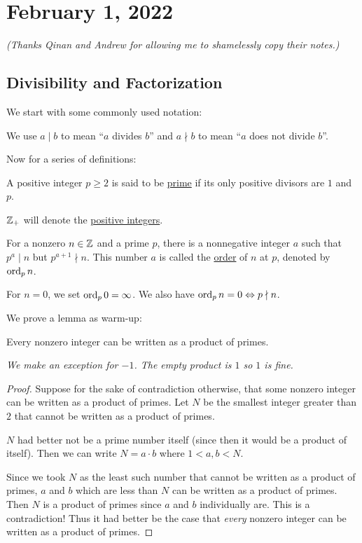 \section{February 1, 2022}

\emph{(Thanks Qinan and Andrew for allowing me to shamelessly copy their notes.)}

\subsection{Divisibility and Factorization}
We start with some commonly used notation:
\begin{definition}[Divisibility]
    We use $a\mid b$ to mean ``$a$ divides $b$'' and $a\nmid b$ to mean ``$a$ does not divide $b$''.
\end{definition}

Now for a series of definitions:

\begin{definition}[Primality]
    A positive integer $p\geq 2$ is said to be \ul{prime} if its only positive divisors are $1$ and $p$.
\end{definition}

\begin{definition}
    $\mathbb Z_+$ will denote the \ul{positive integers}.
\end{definition}

\begin{definition}[Order]
    For a nonzero $n\in \mathbb Z$ and a prime $p$, there is a nonnegative integer $a$ such that $p^a\mid n$ but $p^{a + 1}\nmid n$. This number $a$ is called the \ul{order} of $n$ at $p$, denoted by $\operatorname{ord}_p n$.

    For $n=0$, we set $\operatorname{ord}_p 0 = \infty$. We also have $\operatorname{ord}_p n = 0\Leftrightarrow p\nmid n$.
\end{definition}

We prove a lemma as warm-up:
\begin{lemma}
    Every nonzero integer can be written as a product of primes.

    \emph{We make an exception for $-1$. The empty product is $1$ so $1$ is fine.}
\end{lemma}
\begin{proof}
    Suppose for the sake of contradiction otherwise, that some nonzero integer can be written as a product of primes. Let $N$ be the smallest integer greater than $2$ that cannot be written as a product of primes.

    $N$ had better not be a prime number itself (since then it would be a product of itself). Then we can write $N = a\cdot b$ where $1 < a, b < N$.

    Since we took $N$ as the least such number that cannot be written as a product of primes, $a$ and $b$ which are less than $N$ can be written as a product of primes. Then $N$ is a product of primes since $a$ and $b$ individually are. This is a contradiction! Thus it had better be the case that \emph{every} nonzero integer can be written as a product of primes.
\end{proof}

